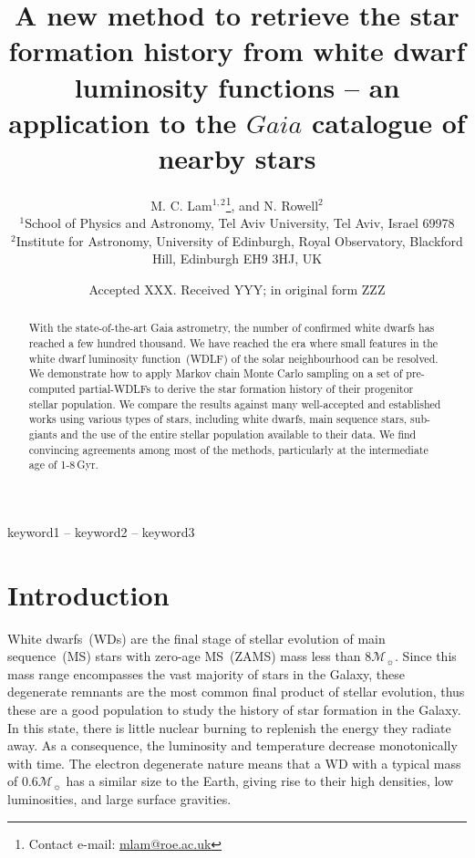 \documentclass[fleqn,usenatbib]{mnras}
\title[Galactic SFH from Gaia GCNS WDLF]{A new method to retrieve the star formation history from white dwarf luminosity functions -- an application to the $Gaia$ catalogue of nearby stars}
\author[M. C. Lam et al.]{
M. C. Lam$^{1, 2}$\thanks{Contact e-mail: \href{mailto:mlam@roe.ac.uk}{mlam@roe.ac.uk}},
and N. Rowell$^{2}$
\\
$^{1}$School of Physics and Astronomy, Tel Aviv University, Tel Aviv, Israel 69978\\
$^{2}$Institute for Astronomy, University of Edinburgh, Royal Observatory, Blackford Hill, Edinburgh EH9 3HJ, UK
}
\date{Accepted XXX. Received YYY; in original form ZZZ}
\newcommand{\msun}{\mathcal{M}_{\sun}}
\begin{document}
\label{firstpage}
\pagerange{\pageref{firstpage}--\pageref{lastpage}}
\maketitle


\begin{abstract}
With the state-of-the-art Gaia astrometry, the number of confirmed white dwarfs
has reached a few hundred thousand. We have reached the era where small features
in the white dwarf luminosity function~(WDLF) of the solar neighbourhood can be
resolved. We demonstrate how to apply Markov chain Monte Carlo sampling on a
set of pre-computed partial-WDLFs to derive the star formation history of their
progenitor stellar population. We compare the results against many well-accepted
and established works using various types of stars, including white dwarfs,
main sequence stars, sub-giants and the use of the entire stellar population
available to their data. We find convincing agreements among most of the
methods, particularly at the intermediate age of 1-8\,Gyr.

\end{abstract}

\begin{keywords}
keyword1 -- keyword2 -- keyword3
\end{keywords}



\section{Introduction}
White dwarfs~(WDs) are the final stage of stellar evolution of main
sequence~(MS) stars with zero-age MS~(ZAMS) mass less than $8\msun$. Since this
mass range encompasses the vast majority of stars in the Galaxy, these
degenerate remnants are the most common final product of stellar evolution,
thus these are a good population to study the history of star formation in the
Galaxy. In this state, there is little nuclear burning to replenish the energy
they radiate away. As a consequence, the luminosity and temperature decrease
monotonically with time. The electron degenerate nature means that a WD with a
typical mass of $0.6\mathcal{M}_{\sun}$ has a similar size to the Earth, giving
rise to their high densities, low luminosities, and large surface gravities.
\end{document}
